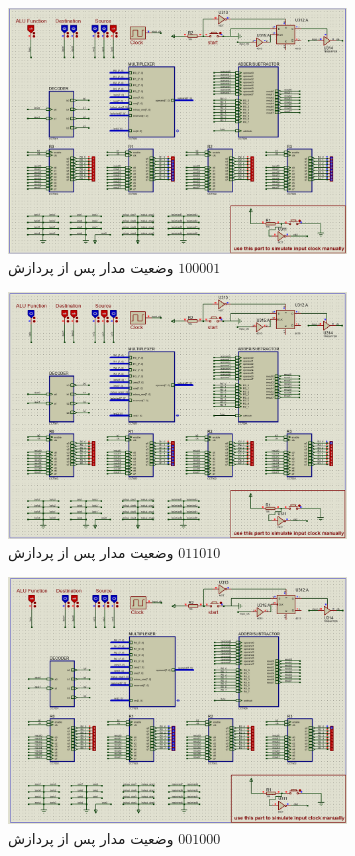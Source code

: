 \documentclass[12pt,onecolumn,a4paper,fleqn]{article}
\begin{document}
	\begin{figure}[H]
		\centering
		\includegraphics[width=0.8\textwidth]{source/inst3.png}
		\caption{‌وضعیت مدار پس از پردازش
			$100001$}
	\end{figure}
	\begin{figure}[H]
		\centering
		\includegraphics[width=0.8\textwidth]{source/inst4.png}
		\caption{‌وضعیت مدار پس از پردازش
			$011010$}
	\end{figure}
	\begin{figure}[H]
		\centering
		\includegraphics[width=0.8\textwidth]{source/inst5.png}
		\caption{‌وضعیت مدار پس از پردازش
			$001000$}
	\end{figure}
\end{document}
